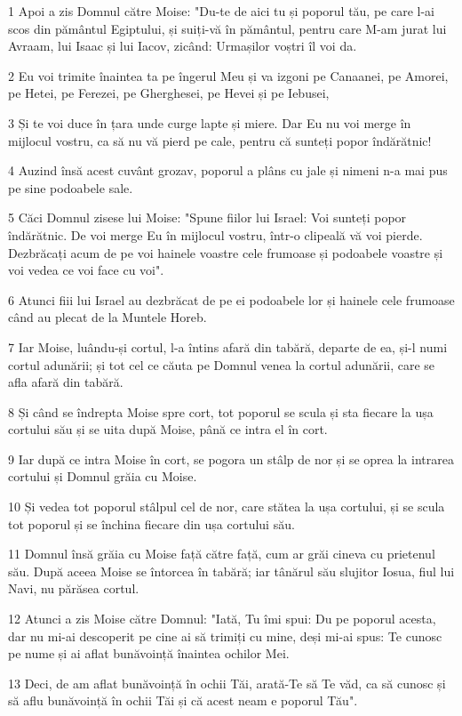 \par 1 Apoi a zis Domnul către Moise: "Du-te de aici tu și poporul tău, pe care l-ai scos din pământul Egiptului, și suiți-vă în pământul, pentru care M-am jurat lui Avraam, lui Isaac și lui Iacov, zicând: Urmașilor voștri îl voi da.
\par 2 Eu voi trimite înaintea ta pe îngerul Meu și va izgoni pe Canaanei, pe Amorei, pe Hetei, pe Ferezei, pe Gherghesei, pe Hevei și pe Iebusei,
\par 3 Și te voi duce în țara unde curge lapte și miere. Dar Eu nu voi merge în mijlocul vostru, ca să nu vă pierd pe cale, pentru că sunteți popor îndărătnic!
\par 4 Auzind însă acest cuvânt grozav, poporul a plâns cu jale și nimeni n-a mai pus pe sine podoabele sale.
\par 5 Căci Domnul zisese lui Moise: "Spune fiilor lui Israel: Voi sunteți popor îndărătnic. De voi merge Eu în mijlocul vostru, într-o clipeală vă voi pierde. Dezbrăcați acum de pe voi hainele voastre cele frumoase și podoabele voastre și voi vedea ce voi face cu voi".
\par 6 Atunci fiii lui Israel au dezbrăcat de pe ei podoabele lor și hainele cele frumoase când au plecat de la Muntele Horeb.
\par 7 Iar Moise, luându-și cortul, l-a întins afară din tabără, departe de ea, și-l numi cortul adunării; și tot cel ce căuta pe Domnul venea la cortul adunării, care se afla afară din tabără.
\par 8 Și când se îndrepta Moise spre cort, tot poporul se scula și sta fiecare la ușa cortului său și se uita după Moise, până ce intra el în cort.
\par 9 Iar după ce intra Moise în cort, se pogora un stâlp de nor și se oprea la intrarea cortului și Domnul grăia cu Moise.
\par 10 Și vedea tot poporul stâlpul cel de nor, care stătea la ușa cortului, și se scula tot poporul și se închina fiecare din ușa cortului său.
\par 11 Domnul însă grăia cu Moise față către față, cum ar grăi cineva cu prietenul său. După aceea Moise se întorcea în tabără; iar tânărul său slujitor Iosua, fiul lui Navi, nu părăsea cortul.
\par 12 Atunci a zis Moise către Domnul: "Iată, Tu îmi spui: Du pe poporul acesta, dar nu mi-ai descoperit pe cine ai să trimiți cu mine, deși mi-ai spus: Te cunosc pe nume și ai aflat bunăvoință înaintea ochilor Mei.
\par 13 Deci, de am aflat bunăvoință în ochii Tăi, arată-Te să Te văd, ca să cunosc și să aflu bunăvoință în ochii Tăi și că acest neam e poporul Tău".
